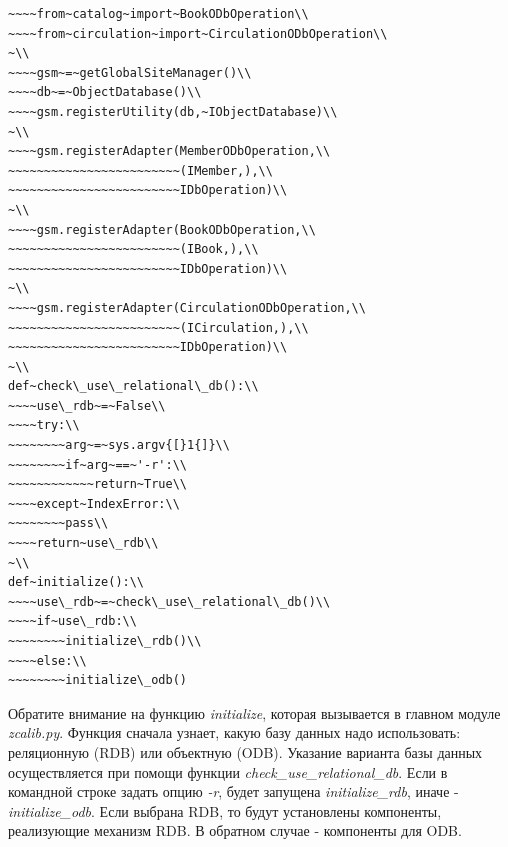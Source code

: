 \documentclass[a4paper,openany,twoside,draft]{book}
\providecommand*{\DUroletitlereference}[1]{\textsl{#1}}
\begin{document}
\begin{verbatim}
~~~~from~catalog~import~BookODbOperation\\
~~~~from~circulation~import~CirculationODbOperation\\
~\\
~~~~gsm~=~getGlobalSiteManager()\\
~~~~db~=~ObjectDatabase()\\
~~~~gsm.registerUtility(db,~IObjectDatabase)\\
~\\
~~~~gsm.registerAdapter(MemberODbOperation,\\
~~~~~~~~~~~~~~~~~~~~~~~~(IMember,),\\
~~~~~~~~~~~~~~~~~~~~~~~~IDbOperation)\\
~\\
~~~~gsm.registerAdapter(BookODbOperation,\\
~~~~~~~~~~~~~~~~~~~~~~~~(IBook,),\\
~~~~~~~~~~~~~~~~~~~~~~~~IDbOperation)\\
~\\
~~~~gsm.registerAdapter(CirculationODbOperation,\\
~~~~~~~~~~~~~~~~~~~~~~~~(ICirculation,),\\
~~~~~~~~~~~~~~~~~~~~~~~~IDbOperation)\\
~\\
def~check\_use\_relational\_db():\\
~~~~use\_rdb~=~False\\
~~~~try:\\
~~~~~~~~arg~=~sys.argv{[}1{]}\\
~~~~~~~~if~arg~==~'-r':\\
~~~~~~~~~~~~return~True\\
~~~~except~IndexError:\\
~~~~~~~~pass\\
~~~~return~use\_rdb\\
~\\
def~initialize():\\
~~~~use\_rdb~=~check\_use\_relational\_db()\\
~~~~if~use\_rdb:\\
~~~~~~~~initialize\_rdb()\\
~~~~else:\\
~~~~~~~~initialize\_odb()
\end{verbatim}

Обратите внимание на функцию \DUroletitlereference{initialize}, которая вызывается в
главном модуле \DUroletitlereference{zcalib.py}.  Функция сначала узнает, какую базу данных
надо использовать: реляционную (RDB) или объектную (ODB).  Указание
варианта базы данных осуществляется при помощи функции
\DUroletitlereference{check\_use\_relational\_db}.  Если в командной строке задать опцию \DUroletitlereference{-r},
будет запущена \DUroletitlereference{initialize\_rdb}, иначе - \DUroletitlereference{initialize\_odb}.  Если
выбрана RDB, то будут установлены компоненты, реализующие механизм
RDB.  В обратном случае - компоненты для ODB.
\end{document}

